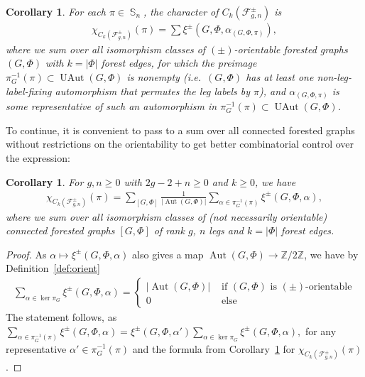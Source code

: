\documentclass[oneside]{amsart}
\newtheorem{corollary}[theorem]{Corollary}
\theoremstyle{remark}
\newcommand{\Z}{\mathbb{Z}}
\DeclareMathOperator{\SG}{{\mathbb S}}
\newcommand{\Aut}{{\operatorname{Aut}}}
\newcommand{\UAut}{{\operatorname{UAut}}}
\newcommand{\F}{\mathcal{F}}
\begin{document}
%
%
\begin{corollary}
\label{cor:trace}
For each $\pi \in \SG_n$, the character of $C_k(\F^\pm_{g,n})$ is
\begin{align*} \chi_{C_k(\F^{\pm}_{g,n})}(\pi) = \sum \xi^\pm(G,\Phi,\alpha_{(G,\Phi,\pi)}), \end{align*}
where we sum over all isomorphism classes of $(\pm)$-orientable forested graphs $(G,\Phi)$ 
with $k=|\Phi|$ forest edges,
for which the preimage $\pi_G^{-1}(\pi) \subset \UAut(G,\Phi)$ is nonempty 
(i.e.~$(G,\Phi)$ has at least one non-leg-label-fixing automorphism that permutes the leg labels by $\pi$),
and $\alpha_{(G,\Phi,\pi)}$ is some representative of such an automorphism in $\pi_G^{-1}(\pi) \subset \UAut(G,\Phi)$.
\end{corollary}
%
%
To continue, it is convenient to pass to a sum over all connected forested graphs without restrictions on the orientability to get better combinatorial control over the expression:
\begin{corollary}
\label{cor:chain_trace}
For $g,n \geq 0$ with $2g - 2 + n \geq 0$ and $k \geq 0$, we have %
\begin{align*} \chi_{C_k(\F^{\pm}_{g,n})}(\pi) = \sum_{[G,\Phi]} \frac{1}{|\Aut(G,\Phi)|} \sum_{\alpha \in \pi_G^{-1}(\pi)} \xi^\pm(G,\Phi,\alpha), \end{align*}
where we sum over all isomorphism classes of (not necessarily orientable) connected forested graphs $[G,\Phi]$ of rank $g$, $n$ legs and $k=|\Phi|$ forest edges.
\end{corollary}
\begin{proof}
As $\alpha \mapsto \xi^\pm(G,\Phi,\alpha)$ also gives a map $\Aut(G,\Phi)\rightarrow \Z/2\Z$, 
we have by Definition~\ref{def:orient}
\begin{align*} \sum_{\alpha \in \ker \pi_G} \xi^\pm(G,\Phi,\alpha) = \begin{cases} |\Aut(G,\Phi)|&\text{ if $(G,\Phi)$ is $(\pm)$-orientable} \\
0 & \text{ else} \end{cases} \end{align*}
The statement follows, as $ \sum_{\alpha \in \pi_G^{-1}(\pi)} \xi^\pm(G,\Phi,\alpha) = \xi^\pm(G,\Phi,\alpha') \sum_{\alpha \in \ker \pi_G} \xi^\pm(G,\Phi,\alpha),$
for any representative $\alpha' \in \pi_G^{-1}(\pi)$ and the formula from Corollary~\ref{cor:trace} for $\chi_{C_k(\F^{\pm}_{g,n})}(\pi)$.
\end{proof}
\end{document}
